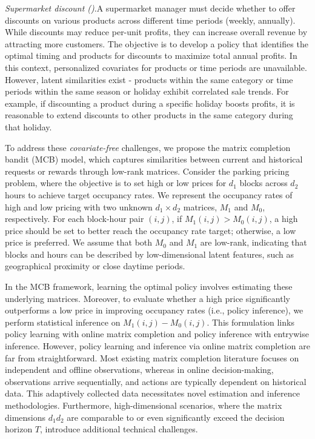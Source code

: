 \documentclass[12pt]{article}
\theoremstyle{plain}
\begin{document}
\emph{Supermarket discount (\cite{walmart})}.A supermarket manager must decide whether to offer discounts on various products across different time periods (weekly, annually). While discounts may reduce per-unit profits, they can increase overall revenue by attracting more customers. The objective is to develop a policy that identifies the optimal timing and products for discounts to maximize total annual profits. In this context, personalized covariates for products or time periods are unavailable. However, latent similarities exist - products within the same category or time periods within the same season or holiday exhibit correlated sale trends. For example, if discounting a product during a specific holiday boosts profits, it is reasonable to extend discounts to other products in the same category during that holiday. 

To address these \emph{covariate-free} challenges, we propose the matrix completion bandit (MCB) model, which captures similarities between current and historical requests or rewards through low-rank matrices. Consider the parking pricing problem, where the objective is to set high or low prices for $d_1$ blocks across $d_2$ hours to achieve target occupancy rates. We represent the occupancy rates of high and low pricing with two unknown $d_1\times d_2$  matrices, $M_1$	and $M_0$, respectively. For each block-hour pair $(i,j)$, if $M_1(i,j)>M_0(i,j)$, a high price should be set to better reach the occupancy rate target; otherwise, a low price is preferred. We assume that both $M_0$ and $M_1$ are low-rank, indicating that blocks and hours can be described by low-dimensional latent features, such as geographical proximity or close daytime periods. 

In the MCB framework, learning the optimal policy involves estimating these underlying matrices. Moreover, to evaluate whether a high price significantly outperforms a low price in improving occupancy rates (i.e., policy inference), we perform statistical inference on $M_1(i,j)-M_0(i,j)$. This formulation links policy learning with online matrix completion and policy inference with entrywise inference. However, policy learning and inference via online matrix completion are far from straightforward. Most existing matrix completion literature focuses on independent and offline observations, whereas in online decision-making, observations arrive sequentially, and actions are typically dependent on historical data. This adaptively collected data necessitates novel estimation and inference methodologies. Furthermore, high-dimensional scenarios, where the matrix dimensions $d_1d_2$ 
are comparable to or even significantly exceed the decision horizon $T$, introduce additional technical challenges.
\end{document}
